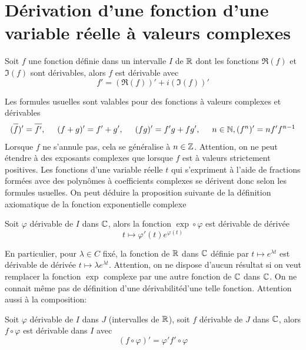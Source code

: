 \section{Dérivation d'une fonction d'une variable réelle à valeurs complexes}
\begin{defi}
Soit $f$ une fonction définie dans un intervalle $I$ de $\mathbb{R}$ dont les fonctions $\Re(f)$ et $\Im(f)$ sont dérivables, alors $f$ est dérivable avec
\begin{displaymath}
  f' = \left( \Re(f)\right)' + i\left( \Im(f)\right)'  
\end{displaymath}
\end{defi}
Les formules usuelles sont valables pour des fonctions à valeurs complexes et dérivables
\begin{displaymath}
  (\overline{f\strut})' = \overline{f'\strut}, \hspace{0.5cm} (f+g)' = f' +g', \hspace{0.5cm} (fg)' = f'g + fg', \hspace{0.5cm} n\in \mathbb{N}, (f^n)' = nf'f^{n-1}
\end{displaymath}
Lorsque $f$ ne s'annule pas, cela se généralise à $n\in \mathbb{Z}$. Attention, on ne peut étendre à des exposants complexes que lorsque $f$ est à valeurs strictement positives. Les fonctions d'une variable réelle $t$ qui s'expriment à l'aide de fractions formées avce des polynômes à coefficients complexes se dérivent donc selon les formules usuelles.\newline
On peut déduire la proposition suivante de la définition axiomatique de la fonction exponentielle complexe
\begin{prop}
  Soit $\varphi$ dérivable de $I$ dans $\mathbb{C}$, alors la fonction $\exp \circ \varphi$ est dérivable  de dérivée
  \begin{displaymath}
    t \mapsto \varphi'(t)e^{\varphi(t)}
  \end{displaymath}
\end{prop}
En particulier, pour $\lambda\in C$ fixé, la fonction de $\mathbb{R}$ dans $\mathbb{C}$ définie par $t\mapsto e^{\lambda t}$ est dérivable de dérivée $t\mapsto \lambda e^{\lambda t}$. Attention, on ne dispose d'aucun résultat si on veut remplacer la fonction $\exp$ complexe par une autre fonction de $\mathbb{C}$ dans $\mathbb{C}$. On ne connait même pas de définition d'une \og dérivabilité d'une telle fonction.\newline
Attention aussi à la composition:
\begin{prop}
  Soit $\varphi$ dérivable de $I$ dans $J$ (intervalles de $\mathbb{R}$), soit $f$ dérivable de $J$ dans $\mathbb{C}$, alors $f\circ \varphi$ est dérivable dans $I$ avec
  \begin{displaymath}
    (f\circ \varphi)' = \varphi' f'\circ \varphi
  \end{displaymath}
\end{prop}
